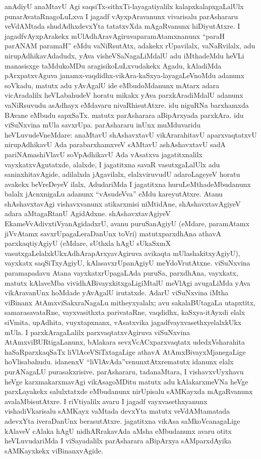 anAdiyU anaMtavU Agi saqsiTx-sithxTi-layagatiyalilx kalapxkalapxgaLalUlx punarA\-vataRnagoLuLxva I jagadf vAyxpAravanunx vivarisalu parAshararu veVdAMtada shudAdhx\-devxYta tatatxvXda mAgaRvanunx hiDiyutAtxre. I jagadfvAyxpArakekx mUlAdhAravAgiruva\break paramAtamxnanunx ``paraH parANAM paramaH'' eMdu vaNiRsutAtx, adakekx rUpavilalx, vaNaR\-vilalx, adu nirupAdhikavAdadudx, yAva visheVSaNagaLiMdalU adu iMthadeMdu heVLi manasisxge taMdukoMDu aragisikoLuLxvudakekx Agadu, kAladiMda pArxpatxvAguva janamx-\-vaqdidhx-vikAra-kaSxya-layagaLeVnoMdu adanunx soVkadu, matutx adu yAvAgalU ide eMbudoMdanunx mAtarx adara vicAradalilx heVLabahudeV horatu mikakx yAva parxkAradiMdalU adanunx vaNiRsuvudu asAdhayx eMdavaru nivaRhisutAtxre. idu niguRNa barxhamxda BAvane eMbudu sapxSaTx. matutx parAsharara aBipArxyada parxkAra. idu viSuNxvina mUla savxrUpa. parAshararu inUnx muMduvaridu heVLuvudeVneMdare: anaMtavU shAshavxtavU vikArarahitavU aparxvaqtatxvU nirupAdhikavU Ada parabarxhamxveV sAMtavU ashAshavxtavU sadA pariNAmashiVlavU soVpAdhikavU Ada vAsatxva jagatitxnalilx vayxkatxvAgutatxde, alalxde, I jagatitxna savaR vasutxgaLalUlx adu saninxhitavAgide, adilalxda jAgavilalx, elalxviruvudU adaroLageyeV horatu avakekx beVreDeyeV ilalx, Aduda\-riMda I jagatitxna huruLeMthadeMbudanunx balalx jAcnxnigaLu adanunx ``vAsudeVva'' eMdu kareyutAtxre. Atanu shAshavxtavAgi vishavxvanunx atikarxmisi niMtidAne, shAshavxtavAgiyeV adara aMtagaRtanU AgidAdxne. shAshavxtavAgiyeV EkameVvAdivxtiVyanAgidadxrU, avanu puruSanAgiyU (eMdare, paramAtamx jiVvAtamx savxrUpagaLeraDanUnx toVri) matutx\break parxdhAna athavA parxkaqtiyAgiyU (eMdare, sUthxla hAgU sUkaSxmX vasutxgaLelalxkUkx\break AdhArapArxyavAgiruva avikaqta mUlashakitxyAgiyU), vayxkatx saqSiTxyAgiyU, kAla\-savxrUpanAgiyU meYdoVrutAtxne. viSuNxvina paramapadavu Atana vayxkatxrUpagaLAda puruSa, parxdhAna, vayxkatx, matutx kAlaveMba vividhABivayxkitxgaLigiMtalU meVlAgi avu\-gaLiMda yAva vikAravanUnx hoMdade yAvAgalU irutatxde. AdarU viSuNx\-vina iMtha viBinanx AtAmxviSakxraNagaLu mitheyxyalalx; avu sakalaBUtagaLa utapxtitx, samarasa\-vataRne, vayxvasithxta parivataRne, vaqdidhx, kaSxya-itAyxdi elalx siVmita, upAdhita, vuyxtapxnanx, vAsatxvika jagadfvayxvasethxyelalxkUkx mUla. I parxkAragaLalilx parxvaqtatxvAgiruva viSuNxvina AtAmxviBURtigaLanunx, bAlakara sevxVcACxparxvaqtatx udedxVsharahita haSaRparxkaqSaTx liVlAceVSiTxta\-gaLige athavA AtAmxBivayxMjanegaLige hoVlisabahudu. idanenxV ``liVlAvAda''venunxtAtxre\break matutx idanunx elalx purANagaLU purasakxrisive. parAshararu, tadanaMtara, I vishavx\-vUyxhavu heVge karxmakarxmavAgi vikAsagoMDitu matutx adu kAlakarxmeVNa heVge parxLayakekx salulxtatxde eMbudanunx nirUpisalu sAMKayxda mAgaRvanunx avalaMbisutAtxre. I riVti\-yalilx avaru I jagadf vayxvasethxyanunx vishadiVkarisalu sAMKayx vaMtada devxYta matutx veVdAMtamatada adevxYta iveraDanUnx berasutAtxre. jagatitxna vikAsa saMkoVcanagaLige kAlaveV cAlaka hAgU nidhARrakavAda aMsha eMbudanunx avaru otitx heVLuvudariMda I viSayadalilx parAsharara aBipArxya sAMparxdAyika sAMKayxkekx viBinanxvAgide.

